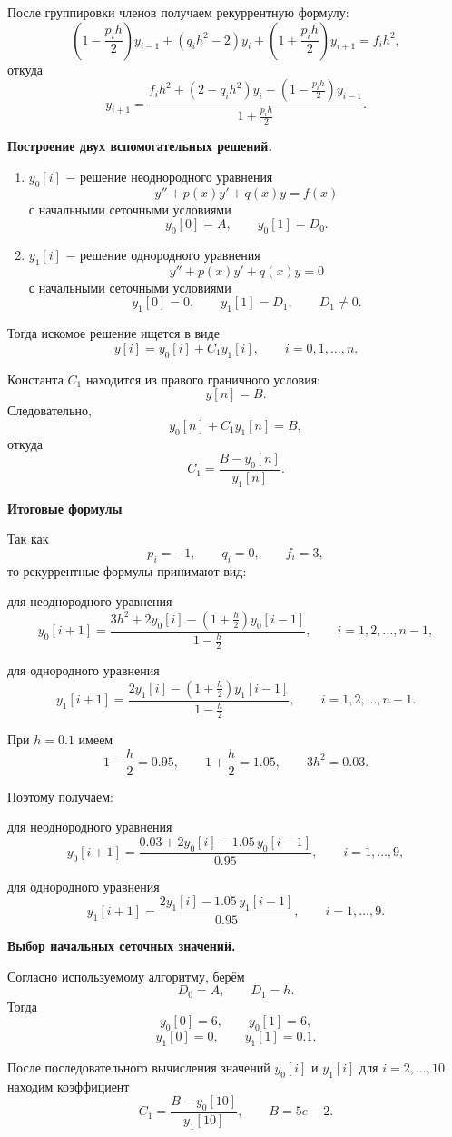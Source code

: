 После группировки членов получаем рекуррентную формулу:
\[
    \left(1-\frac{p_i h}{2}\right)y_{i-1}
    +\left(q_i h^2-2\right)y_i
    +\left(1+\frac{p_i h}{2}\right)y_{i+1}
    = f_i h^2,
\]
откуда
\[
    y_{i+1}
    =
    \frac{
    f_i h^2 + (2-q_i h^2)y_i - \left(1-\frac{p_i h}{2}\right)y_{i-1}
    }{
    1+\frac{p_i h}{2}
    }.
\]

\textbf{Построение двух вспомогательных решений.}

\begin{enumerate}
    \item \(y_0[i]\) $-$ решение неоднородного уравнения
          \[
              y'' + p(x)y' + q(x)y = f(x)
          \]
          с начальными сеточными условиями
          \[
              y_0[0]=A, \qquad y_0[1]=D_0.
          \]

    \item \(y_1[i]\) $-$ решение однородного уравнения
          \[
              y'' + p(x)y' + q(x)y = 0
          \]
          с начальными сеточными условиями
          \[
              y_1[0]=0, \qquad y_1[1]=D_1, \qquad D_1 \neq 0.
          \]
\end{enumerate}

Тогда искомое решение ищется в виде
\[
    y[i]=y_0[i]+C_1 y_1[i], \qquad i=0,1,\dots,n.
\]

Константа \(C_1\) находится из правого граничного условия:
\[
    y[n]=B.
\]
Следовательно,
\[
    y_0[n]+C_1 y_1[n]=B,
\]
откуда
\[
    C_1=\frac{B-y_0[n]}{y_1[n]}.
\]

\textbf{Итоговые формулы}

Так как
\[
    p_i=-1, \qquad q_i=0, \qquad f_i=3,
\]
то рекуррентные формулы принимают вид:

для неоднородного уравнения
\[
    y_0[i+1]
    =
    \frac{
    3h^2 + 2y_0[i] - \left(1+\frac{h}{2}\right)y_0[i-1]
    }{
    1-\frac{h}{2}
    },
    \qquad i=1,2,\dots,n-1,
\]

для однородного уравнения
\[
    y_1[i+1]
    =
    \frac{
    2y_1[i] - \left(1+\frac{h}{2}\right)y_1[i-1]
    }{
    1-\frac{h}{2}
    },
    \qquad i=1,2,\dots,n-1.
\]

При \(h=0.1\) имеем
\[
    1-\frac{h}{2}=0.95, \qquad 1+\frac{h}{2}=1.05, \qquad 3h^2=0.03.
\]

Поэтому получаем:

для неоднородного уравнения
\[
    y_0[i+1]=\frac{0.03+2y_0[i]-1.05\,y_0[i-1]}{0.95},
    \qquad i=1,\dots,9,
\]

для однородного уравнения
\[
    y_1[i+1]=\frac{2y_1[i]-1.05\,y_1[i-1]}{0.95},
    \qquad i=1,\dots,9.
\]

\textbf{Выбор начальных сеточных значений.}

Согласно используемому алгоритму, берём
\[
    D_0=A,
    \qquad
    D_1=h.
\]
Тогда
\[
    y_0[0]=6, \qquad y_0[1]=6,
\]
\[
    y_1[0]=0, \qquad y_1[1]=0.1.
\]

После последовательного вычисления значений \(y_0[i]\) и \(y_1[i]\) для \(i=2,\dots,10\) находим коэффициент
\[
    C_1=\frac{B-y_0[10]}{y_1[10]},
    \qquad B=5e-2.
\]
